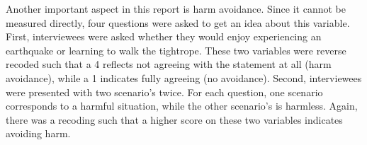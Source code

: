 \documentclass[11pt]{article}
\begin{document}
Another important aspect in this report is harm avoidance. Since it cannot be measured directly, four questions were asked to get an idea about this variable.
First, interviewees were asked whether they would enjoy experiencing an earthquake or learning to walk the tightrope.
These two variables were reverse recoded such that a 4 reflects not agreeing with the statement at all (harm avoidance), while a 1 indicates fully agreeing (no avoidance).
Second, interviewees were presented with two scenario's twice.
For each question, one scenario corresponds to a harmful situation, while the other scenario's is harmless.
Again, there was a recoding such that a higher score on these two variables indicates avoiding harm.

\begin{table}[h!]
\end{table}
\end{document}
